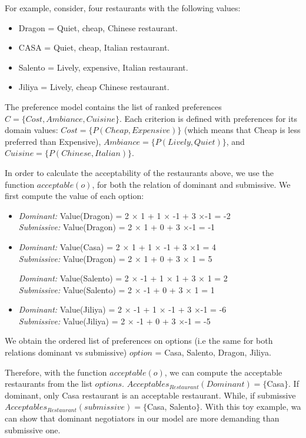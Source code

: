 \documentclass{llncs}
\begin{document}
\par For example, consider, four restaurants with the following values:
\begin{itemize}
	\item	Dragon = Quiet, cheap, Chinese restaurant.
	\item	CASA = Quiet, cheap, Italian restaurant.
	\item	Salento = Lively, expensive, Italian restaurant.
	\item   Jiliya = Lively, cheap Chinese restaurant.
\end{itemize}

The preference model contains the list of ranked preferences $C = \{Cost, Ambiance, Cuisine\}$. Each criterion is defined with preferences for its domain values: $ Cost = \{P(Cheap, Expensive)\}$ (which means that Cheap is less preferred than Expensive), $Ambiance= \{P(Lively, Quiet)\}$, and $Cuisine= \{P(Chinese, Italian)\}$.

In order to calculate the acceptability of the restaurants above, we use the function $acceptable(o)$, for both the relation of dominant and submissive. We first compute the value of each option:
\begin{itemize}
	\item \emph{Dominant:}	Value(Dragon) = 2 $\times$ 1 + 1 $\times$ -1 + 3 $\times$-1 = -2
	\\ \emph{Submissive:} Value(Dragon) = 2 $\times$ 1 + 0 + 3 $\times$-1 = -1
	
	\item \emph{Dominant:}	Value(Casa) = 2 $\times$ 1 + 1 $\times$ -1 + 3 $\times$1 = 4
	\\ \emph{Submissive:} Value(Dragon) = 2 $\times$ 1 + 0 + 3 $\times$ 1 = 5
	
	 \emph{Dominant:}	Value(Salento) = 2 $\times$ -1 + 1 $\times$ 1 + 3 $\times$ 1 = 2
	 \\ \emph{Submissive:} Value(Salento) = 2 $\times$ -1 + 0 + 3 $\times$ 1 = 1
	 
	\item \emph{Dominant:}	Value(Jiliya) = 2 $\times$ -1 + 1 $\times$ -1 + 3 $\times$-1 = -6
	\\ \emph{Submissive:} Value(Jiliya) = 2 $\times$ -1 + 0 + 3 $\times$-1 = -5
\end{itemize}
We obtain the ordered list of preferences on options (i.e the same for both relations dominant vs submissive) $option$ = {Casa, Salento, Dragon, Jiliya}.

Therefore, with  the function $acceptable(o)$, we can compute the acceptable restaurants from the list $options$. $Acceptables_{Restaurant}(Dominant) = \{$Casa$\}.$ If dominant, only Casa restaurant is an acceptable restaurant. While, if submissive $Acceptables_{Restaurant}(submissive) = \{$Casa, Salento$\}.$ With this toy example, wa can show that dominant negotiators in our model are more demanding than submissive one.
\end{document}
